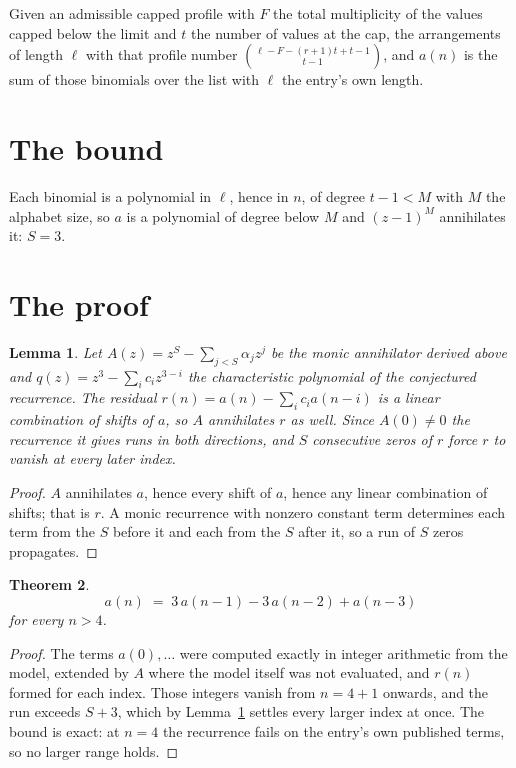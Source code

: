 \documentclass[11pt,a4paper]{article}
\theoremstyle{plain}
\newtheorem{theorem}{Theorem}
\newtheorem{lemma}[theorem]{Lemma}
\theoremstyle{definition}
\begin{document}
Given an admissible capped profile with $F$ the total multiplicity of the values capped below
the limit and $t$ the number of values at the cap, the arrangements of length $\ell$ with that
profile number $\binom{\ell-F-(r+1)t+t-1}{t-1}$, and $a(n)$ is the sum of those binomials
over the list with $\ell$ the entry's own length.

\section{The bound}

Each binomial is a polynomial in $\ell$, hence in $n$, of degree $t-1<M$ with $M$ the alphabet
size, so $a$ is a polynomial of degree below $M$ and $(z-1)^{M}$ annihilates it: $S=3$.

\section{The proof}

\begin{lemma}\label{lem:crit}
Let $A(z)=z^S-\sum_{j<S}\alpha_jz^{j}$ be the monic annihilator derived above and
$q(z)=z^{3}-\sum_ic_iz^{3-i}$ the characteristic polynomial of the conjectured
recurrence. The residual $r(n)=a(n)-\sum_ic_ia(n-i)$ is a linear combination of shifts of $a$,
so $A$ annihilates $r$ as well. Since $A(0)\ne0$ the recurrence it gives runs in both
directions, and $S$ consecutive zeros of $r$ force $r$ to vanish at every later index.
\end{lemma}

\begin{proof}
$A$ annihilates $a$, hence every shift of $a$, hence any linear combination of shifts; that is
$r$. A monic recurrence with nonzero constant term determines each term from the $S$ before it
and each from the $S$ after it, so a run of $S$ zeros propagates.
\end{proof}

\begin{theorem}
\[
a(n)\;=\;3\,a(n-1) - 3\,a(n-2) + a(n-3)
\]
for every $n>4$.
\end{theorem}

\begin{proof}
The terms $a(0),\dots$ were computed exactly in integer arithmetic from the model, extended by
$A$ where the model itself was not evaluated, and $r(n)$ formed for each index. Those integers
vanish from $n=4+1$ onwards, and the run exceeds $S+3$, which by
Lemma~\ref{lem:crit} settles every larger index at once. The bound is exact: at $n=4$ the recurrence fails on the entry's own published terms, so no larger range holds.
\end{proof}
\end{document}
